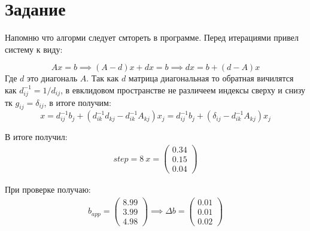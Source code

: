 \section{Задание}

Напомню что алгорми следует смтореть в программе. Перед итерациями 
привел систему к виду:

\begin{equation}
    Ax = b \implies (A - d)x + dx = b \implies d x = b + (d - A)x
\end{equation}
Где $d$ это диагональ $A$. Так как $d$ матрица диагональная то обратная
вичилятся как $d_{ij}^{-1} = 1/d_{ij}$, в евклидовом пространстве не 
различеем индексы сверху и снизу тк $g_{ij} = \delta_{ij}$, в итоге получим:
\begin{equation}
    x = d_{ij}^{-1} b_j + (d^{-1}_{ik} d_{kj} - d^{-1}_{ik} A_{kj}) x_j 
    = d_{ij}^{-1} b_j + (\delta_{ij} - d^{-1}_{ik} A_{kj}) x_j
\end{equation}

В итоге получил:
\begin{gather}
    step = 8 
    \
    x = 
    \begin{pmatrix}
        0.34\\ 
        0.15\\ 
        0.04
    \end{pmatrix}
\end{gather}

При проверке получаю:
\begin{gather}
    b_{app} = 
    \begin{pmatrix}
        8.99\\ 
        3.99\\ 
        4.98
    \end{pmatrix}
    \implies
    \Delta b =
    \begin{pmatrix}
        0.01\\ 
        0.01\\ 
        0.02
    \end{pmatrix}
\end{gather}


